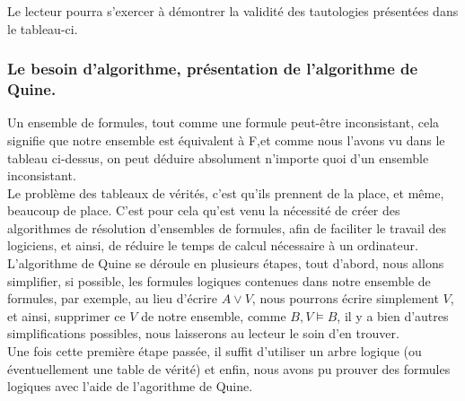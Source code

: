 \documentclass[a4paper, 12pt]{article}
\numberwithin{equation}{subsection}
\begin{document}
\FloatBarrier
Le lecteur pourra s'exercer à démontrer la validité des tautologies présentées dans le tableau-ci. \\
\subsubsection{Le besoin d'algorithme, présentation de l'algorithme de Quine.}

Un ensemble de formules, tout comme une formule peut-être inconsistant, cela signifie que notre ensemble est équivalent à F,et comme nous l'avons vu dans le tableau ci-dessus, on peut déduire absolument n'importe quoi d'un ensemble inconsistant.\\

Le problème des tableaux de vérités, c'est qu'ils prennent de la place, et même, beaucoup de place. C'est pour cela qu'est venu la nécessité de créer des algorithmes de résolution d'ensembles de formules, afin de faciliter le travail des logiciens, et ainsi, de réduire le temps de calcul nécessaire à un ordinateur. \\

L'algorithme de Quine se déroule en plusieurs étapes, tout d'abord, nous allons simplifier, si possible, les formules logiques contenues dans notre ensemble de formules, par exemple, au lieu d'écrire $A \lor V$, nous pourrons écrire simplement $ V $, et ainsi, supprimer ce $V$ de notre ensemble, comme $B, V \models B$, il y a bien d'autres simplifications possibles, nous laisserons au lecteur le soin d'en trouver.\\

Une fois cette première étape passée, il suffit d'utiliser un arbre logique (ou éventuellement une table de vérité) et enfin, nous avons pu prouver des formules logiques avec l'aide de l'agorithme de Quine.
\end{document}
